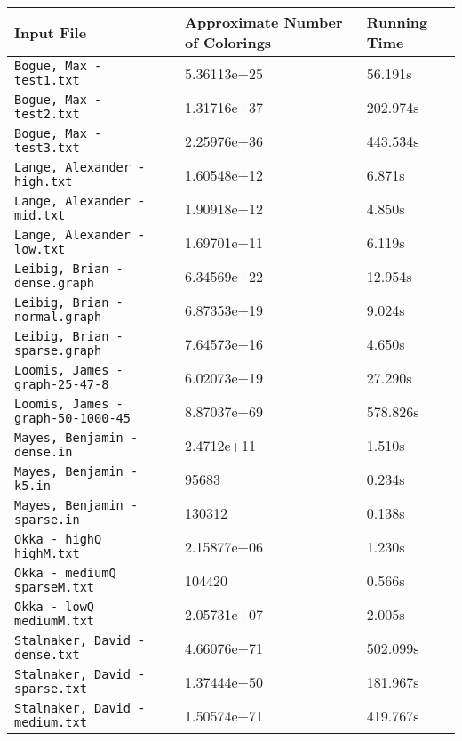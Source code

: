 \documentclass[14]{article}
\begin{document}
\begin{center}
\begin{tabular}{|l|l|l|}
\hline
Input File & Approximate Number of Colorings & Running Time \\\hline
\texttt{Bogue, Max - test1.txt} & 5.36113e+25 & 56.191s\\\hline
\texttt{Bogue, Max - test2.txt} & 1.31716e+37 & 202.974s\\\hline
\texttt{Bogue, Max - test3.txt} & 2.25976e+36 & 443.534s\\\hline
\texttt{Lange, Alexander - high.txt} & 1.60548e+12 & 6.871s\\\hline
\texttt{Lange, Alexander - mid.txt} & 1.90918e+12 & 4.850s\\\hline
\texttt{Lange, Alexander - low.txt} & 1.69701e+11 & 6.119s\\\hline
\texttt{Leibig, Brian - dense.graph} & 6.34569e+22 & 12.954s\\\hline
\texttt{Leibig, Brian - normal.graph} & 6.87353e+19 & 9.024s\\\hline
\texttt{Leibig, Brian - sparse.graph} & 7.64573e+16 & 4.650s\\\hline
\texttt{Loomis, James - graph-25-47-8} & 6.02073e+19 & 27.290s\\\hline
\texttt{Loomis, James - graph-50-1000-45} & 8.87037e+69 & 578.826s\\\hline
\texttt{Mayes, Benjamin - dense.in} & 2.4712e+11 & 1.510s \\\hline
\texttt{Mayes, Benjamin - k5.in} & 95683 & 0.234s\\\hline
\texttt{Mayes, Benjamin - sparse.in} & 130312 & 0.138s\\\hline
\texttt{Okka - highQ highM.txt} & 2.15877e+06 & 1.230s\\\hline
\texttt{Okka - mediumQ sparseM.txt} & 104420 & 0.566s\\\hline
\texttt{Okka - lowQ mediumM.txt} & 2.05731e+07 & 2.005s\\\hline
\texttt{Stalnaker, David - dense.txt}  &  4.66076e+71 & 502.099s\\\hline
\texttt{Stalnaker, David - sparse.txt} & 1.37444e+50 & 181.967s \\\hline
\texttt{Stalnaker, David - medium.txt} &  1.50574e+71 &419.767s\\\hline
\end{tabular}
\end{center}
\end{document}
